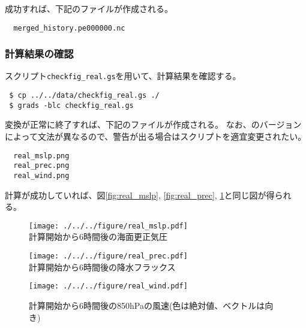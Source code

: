 成功すれば、下記のファイルが作成される。

\begin{verbatim}
  merged_history.pe000000.nc
\end{verbatim}




\subsubsection{計算結果の確認}


\grads スクリプト\verb|checkfig_real.gs|を用いて、計算結果を確認する。
\begin{verbatim}
 $ cp ../../data/checkfig_real.gs ./
 $ grads -blc checkfig_real.gs
\end{verbatim}
変換が正常に終了すれば、下記のファイルが作成される。
なお、\grads のバージョンによって文法が異なるので、警告が出る場合はスクリプトを適宜変更されたい。
\begin{verbatim}
  real_mslp.png
  real_prec.png
  real_wind.png
\end{verbatim}
計算が成功していれば、図\ref{fig:real_mslp}, \ref{fig:real_prec}, \ref{fig:real_wind}と同じ図が得られる。


\begin{figure}[h]
\begin{center}
  \texttt{[image: ./../../figure/real\_mslp.pdf]}\\
  \caption{計算開始から6時間後の海面更正気圧}
  \label{fig:real_mslp}
\end{center}
\begin{center}
  \texttt{[image: ./../../figure/real\_prec.pdf]}\\
  \caption{計算開始から6時間後の降水フラックス}
  \label{fig:real_prec}
\end{center}
\begin{center}
  \texttt{[image: ./../../figure/real\_wind.pdf]}\\
  \caption{計算開始から6時間後の850hPaの風速(色は絶対値、ベクトルは向き)}
  \label{fig:real_wind}
\end{center}
\end{figure}
